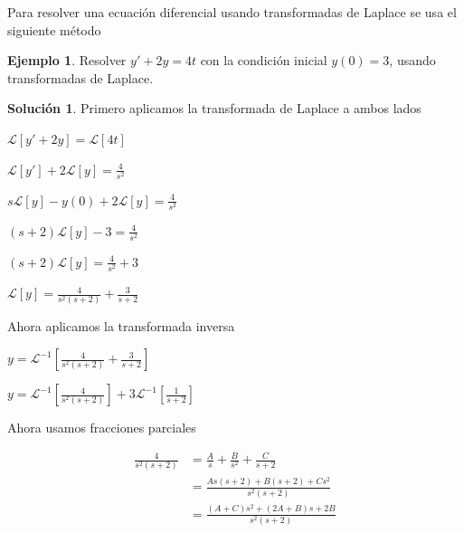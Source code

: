\documentclass{article}
\theoremstyle{plain}
\theoremstyle{definition}
\newtheorem{ejem}[thm]{Ejemplo}
\newtheorem{sol}[thm]{Solución}
\begin{document}
Para resolver una ecuación diferencial usando transformadas de Laplace se usa el siguiente método \\

\begin{ejem}Resolver $y'+2y=4t$ con la condición inicial $y(0)=3$, usando transformadas de Laplace.  \\
\end{ejem}

\begin{sol}Primero aplicamos la transformada de Laplace  a ambos lados
\end{sol}

\begin{center}
$\displaystyle \mathcal{L}[y'+2y]= \mathcal{L}[4t]$
\end{center}

\begin{center}
$\displaystyle \mathcal{L}[y']+2 \mathcal{L}[y]= \frac{4}{s^2}$
\end{center}

\begin{center}
$\displaystyle s\mathcal{L}[y] -y(0)+2 \mathcal{L}[y]= \frac{4}{s^2}$
\end{center}

\begin{center}
$\displaystyle (s+2)\mathcal{L}[y] -3= \frac{4}{s^2}$
\end{center}

\begin{center}
$\displaystyle (s+2)\mathcal{L}[y] = \frac{4}{s^2} +3$
\end{center}

\begin{center}
$\displaystyle \mathcal{L}[y] = \frac{4}{s^2(s+2)} +\frac{3}{s+2}$
\end{center}

Ahora aplicamos la transformada inversa


\begin{center}
$\displaystyle y = \mathcal{L}^{-1}\left[ \frac{4}{s^2(s+2)} +\frac{3}{s+2}\right] $
\end{center}

\begin{center}
$\displaystyle y = \mathcal{L}^{-1}\left[ \frac{4}{s^2(s+2)} \right] +  3\mathcal{L}^{-1} \left[ \frac{1}{s+2}\right] $
\end{center}

Ahora usamos fracciones parciales

\begin{align*}
\displaystyle \frac{4}{s^2(s+2)} &= \frac{A}{s}+\frac{B}{s^2}+\frac{C}{s+2} \\
&= \frac{As(s+2)+ B(s+2)+Cs^2}{s^2(s+2)} \\
&=\frac{(A+C)s^2+(2A+B)s+2B}{s^2(s+2)}
\end{align*}
\end{document}
